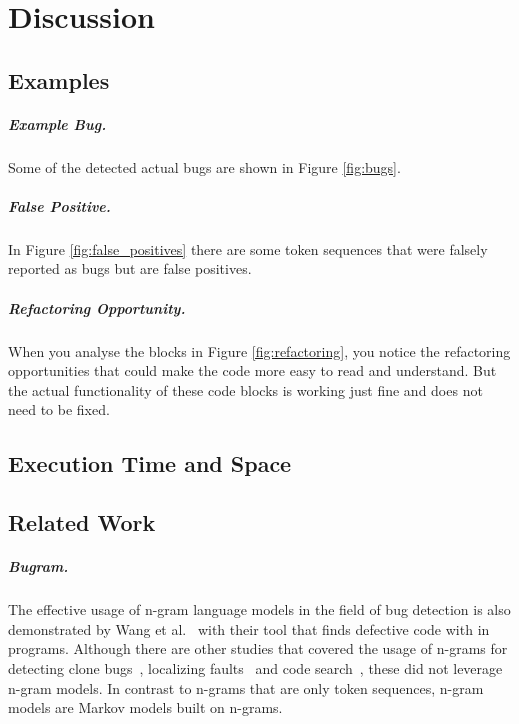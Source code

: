 \chapter{Discussion}\label{chap:discussion}

\section{Examples}

\paragraph{Example Bug.}
Some of the detected actual bugs are shown in Figure \ref{fig:bugs}.
\paragraph{False Positive.}
In Figure \ref{fig:false_positives} there are some token sequences that were falsely reported as bugs but are false positives.
\paragraph{Refactoring Opportunity.}
When you analyse the blocks in Figure \ref{fig:refactoring}, you notice the refactoring opportunities that could make the code more easy to read and understand. But the actual functionality of these code blocks is working just fine and does not need to be fixed.

\section{Execution Time and Space}


\section{Related Work}
\paragraph{Bugram.}
The effective usage of n-gram language models in the field of bug detection is also demonstrated by Wang et al.~\cite{bugram} with their tool \bugram{} that finds defective code with  in \java{} programs. Although there are other studies that covered the usage of n-grams for detecting clone bugs~\cite{clonebugs}, localizing faults~\cite{faults} and code search~\cite{codesearch}, these did not leverage n-gram models. In contrast to n-grams that are only token sequences, n-gram models are Markov models built on n-grams. 
